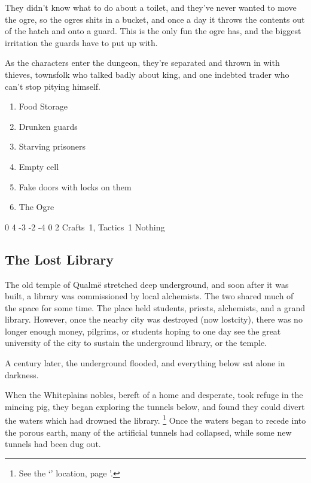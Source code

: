 \begin{multicols}{2}
\begin{boxtext}
\end{boxtext}


They didn't know what to do about a toilet, and they've never wanted to move the ogre, so the ogres shits in a bucket, and once a day it throws the contents out of the hatch and onto a guard.
This is the only fun the ogre has, and the biggest irritation the guards have to put up with.

As the characters enter the dungeon, they're separated and thrown in with thieves, townsfolk who talked badly about \gls{king}, and one indebted trader who can't stop pitying himself.

\begin{enumerate}

	\item{Food Storage}
	\item{Drunken guards}
	\item{Starving prisoners}
	\item{Empty cell}
	\item{Fake doors with locks on them}
	\item{The Ogre}

\end{enumerate}


	{0}%
	{4}%
	{{-3}%
	{-2}%
	{-4}}%
	{0}%
	{2}%
	{Crafts~1, Tactics~1}%
	{Nothing}%
	{}

\subsection{The Lost Library}\label{sewers}\setcounter{list}{0}

The old temple of Qualm\"{e} stretched deep underground, and soon after it was built, a library was commissioned by local alchemists.
The two shared much of the space for some time.
The place held students, priests, alchemists, and a grand library.
However, once the nearby city was destroyed (now \gls{lostcity}), there was no longer enough money, pilgrims, or students hoping to one day see the great university of the city to sustain the underground library, or the temple.

A century later, the underground flooded, and everything below sat alone in darkness.

When the Whiteplains nobles, bereft of a home and desperate, took refuge in the mincing pig, they began exploring the tunnels below, and found they could divert the waters which had drowned the library.%
\footnote{See the `' location, page \pageref{runoff}'.}
Once the waters began to recede into the porous earth, many of the artificial tunnels had collapsed, while some new tunnels had been dug out.


\end{multicols}
